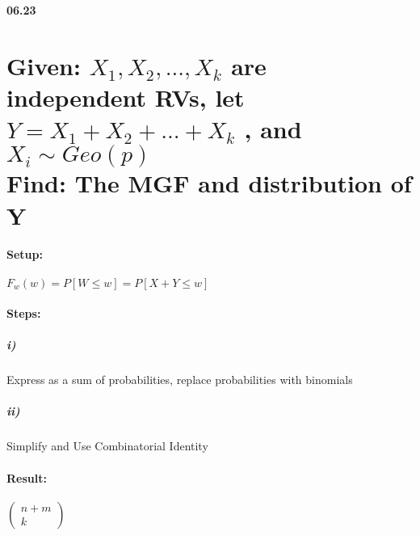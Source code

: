 {\bf 06.23}

\section*{Given: ${X}_{1},{X}_{2},...,{X}_{k}$ are independent RVs, let $Y= {X}_{1}+{X}_{2}+...+{X}_{k}$ , and ${X}_{i}\sim Geo(p)$\\ Find: The MGF and distribution of Y}

\paragraph{Setup:}  ${F}_{w}(w)=P[W\le w]=P[X+Y\le w]$

\paragraph{Steps:} 

\subparagraph{i)} Express as a sum of probabilities, replace probabilities with binomials

\subparagraph{ii)} Simplify and Use Combinatorial Identity

\paragraph{Result:} $\left( \begin{matrix} n+m \\ k \end{matrix} \right) $